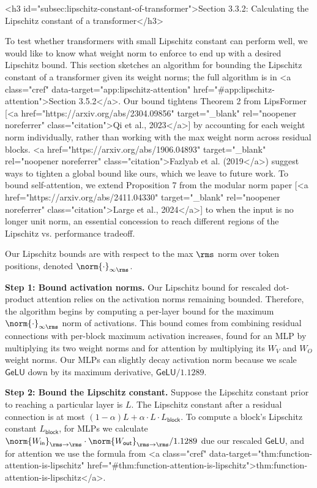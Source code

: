 <h3 id="subsec:lipschitz-constant-of-transformer">Section 3.3.2: Calculating the Lipschitz constant of a transformer</h3>

To test whether transformers with small Lipschitz constant can perform well, we would like to know what weight norm to enforce to end up with a desired Lipschitz bound. This section sketches an algorithm for bounding the Lipschitz constant of a transformer given its weight norms; the full algorithm is in <a class="cref" data-target="app:lipschitz-attention" href="#app:lipschitz-attention">Section 3.5.2</a>. Our bound tightens Theorem 2 from LipsFormer [<a href="https://arxiv.org/abs/2304.09856" target="_blank" rel="noopener noreferrer" class="citation">Qi et al., 2023</a>] by accounting for each weight norm individually, rather than working with the max weight norm across residual blocks. <a href="https://arxiv.org/abs/1906.04893" target="_blank" rel="noopener noreferrer" class="citation">Fazlyab et al. (2019</a>) suggest ways to tighten a global bound like ours, which we leave to future work. To bound self-attention, we extend Proposition 7 from the modular norm paper [<a href="https://arxiv.org/abs/2411.04330" target="_blank" rel="noopener noreferrer" class="citation">Large et al., 2024</a>] to when the input is no longer unit norm, an essential concession to reach different regions of the Lipschitz vs. performance tradeoff.

Our Lipschitz bounds are with respect to the max $\rms$ norm over token positions, denoted $\norm{\cdot}_{\infty\rms}$.

\textbf{Step 1: Bound activation norms.} Our Lipschitz bound for rescaled dot-product attention relies on the activation norms remaining bounded. Therefore, the algorithm begins by computing a per-layer bound for the maximum $\norm{\cdot}_{\infty\rms}$ norm of activations. This bound comes from combining residual connections with per-block maximum activation increases, found for an MLP by multiplying its two weight norms and for attention by multiplying its $W_V$ and $W_O$ weight norms. Our MLPs can slightly decay activation norm because we scale $\mathsf{GeLU}$ down by its maximum derivative, $\mathsf{GeLU}/1.1289$.

\textbf{Step 2: Bound the Lipschitz constant.} Suppose the Lipschitz constant prior to reaching a particular layer is $L$. The Lipschitz constant after a residual connection is at most $(1 - \alpha) L + \alpha \cdot L \cdot L_\mathsf{block}$. To compute a block's Lipschitz constant $L_\mathsf{block}$, for MLPs we calculate $\norm{W_\mathsf{in}}_{\rms\to\rms} \cdot \norm{W_\mathsf{out}}_{\rms\to\rms} / 1.1289$ due our rescaled $\mathsf{GeLU}$, and for attention we use the formula from <a class="cref" data-target="thm:function-attention-is-lipschitz" href="#thm:function-attention-is-lipschitz">thm:function-attention-is-lipschitz</a>.

